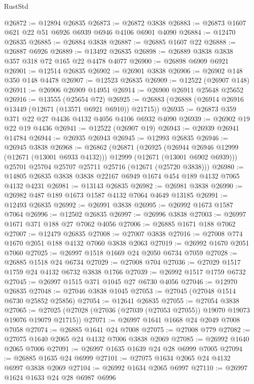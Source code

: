 \begin{lexlean}{RustStd}
\begin{coremodule}
@26872 := @12894 @26835
@26873 := @26872 @3838
@26883 := @26873 @1607 @621 @22 @51 @6926 @6939 @6946 @4106 @6901 @4090
@26884 := @12470 @26835
@26885 := @26884 @3838
@26887 := @26885 @1607 @22
@26888 := @26887 @6926
@26889 := @13492 @26835
@26898 := @26889 @3838 @3838 @357 @318 @72 @165 @22 @4478 @4077
@26900 := @26898 @6909 @6921
@26901 := @12514 @26835
@26902 := @26901 @3838
@26906 := @26902 @148 @350 @148 @4478
@26907 := @12523 @26835
@26909 := @12522 (@26907 @148)
@26911 := @26906 @26909 @14951
@26914 := @26900 @26911 @25648 @25652
@26916 := @13555 (@25654 @72)
@26925 := @26883 (@26888 (@26914 @26916 @13449 (@12671 (@13571 @6921 @6910)) @21715))
@26935 := @26873 @359 @371 @22 @27 @4436 @4132 @4056 @4106 @6932 @4090
@26939 := @26902 @19 @22 @19 @4436
@26941 := @12522 (@26907 @19)
@26943 := @26939 @26941 @14784
@26944 := @26935 @26943
@26945 := @12993 @26835
@26946 := @26945 @3838
@26968 := @26862
    (@26871
      (@26925
        (@26944 @26946 @12999 (@12671 (@13001 @6933 @4132)))
        @12999
        (@12671 (@13001 @6902 @6939)))
      @25701
      @25704
      @25707
      @25711
      @25716
      (@12671 (@25720 @3838)))
@26980 := @14805 @26835 @3838 @3838 @22167 @6949 @1674 @454 @189 @4132 @7065 @4132 @4231
@26981 := @13143 @26835
@26982 := @26981 @3838
@26990 := @26982 @487 @189 @1673 @1587 @4132 @7064 @4649 @13185
@26991 := @12493 @26835
@26992 := @26991 @3838
@26995 := @26992 @1673 @1587 @7064
@26996 := @12502 @26835
@26997 := @26996 @3838
@27003 := @26997 @1671 @371 @188 @27 @7062 @4056
@27006 := @26885 @1671 @188 @7062
@27007 := @12479 @26835
@27008 := @27007 @3838
@27016 := @27008 @774 @1670 @2051 @188 @4132 @7060 @3838 @2063
@27019 := @26992 @1670 @2051 @7060
@27025 := @26997 @1518 @1669 @24 @2050 @6734 @7059
@27028 := @26885 @1518 @24 @6734
@27029 := @27008 @704
@27036 := @27029 @1517 @1759 @24 @4132 @6732 @3838 @1766
@27039 := @26992 @1517 @1759 @6732
@27045 := @26997 @1515 @371 @1045 @27 @6730 @4056
@27046 := @12970 @26835
@27048 := @27046 @3838 @1045
@27053 := @27045 (@27048 @1514 @6730 @25852 @25856)
@27054 := @12641 @26835
@27055 := @27054 @3838
@27065 := @27025 (@27028 (@27036 (@27039 (@27053 @27055)) @19070 @19073 @19076 @19079 @21715))
@27071 := @26997 @1641 @1668 @24 @2049 @7008 @7058
@27074 := @26885 @1641 @24 @7008
@27075 := @27008 @779
@27082 := @27075 @1640 @2065 @24 @4132 @7006 @3838 @2069
@27085 := @26992 @1640 @2065 @7006
@27091 := @26997 @1635 @1639 @24 @28 @6999 @7005
@27094 := @26885 @1635 @24 @6999
@27101 := @27075 @1634 @2065 @24 @4132 @6997 @3838 @2069
@27104 := @26992 @1634 @2065 @6997
@27110 := @26997 @1624 @1633 @24 @28 @6987 @6996

\end{coremodule}
\end{lexlean}
